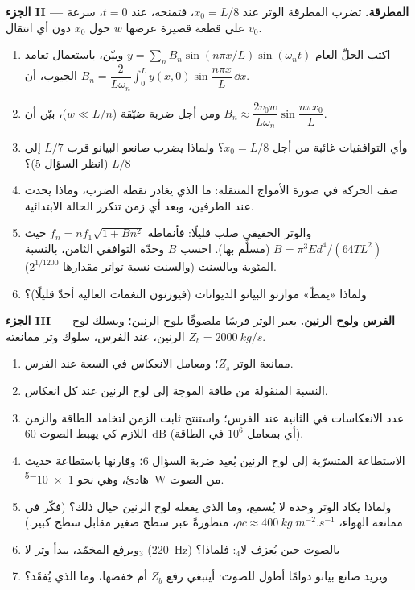 \begin{problem}
\medskip
\noindent\textbf{الجزء II --- المطرقة.}
تضرب المطرقة الوتر عند $x_0 = L/8$، فتمنحه، عند $t = 0$،
سرعة $v_0$ على قطعة قصيرة عرضها $w$ حول $x_0$ دون أي
انتقال.
\begin{enumerate}[resume]
  \item اكتب الحلّ العام $y = \sum_nB_n\sin(n\pi x/L)\sin(\omega_nt)$
        وبيّن، باستعمال تعامد الجيوب، أن $B_n =
        \dfrac{2}{L\omega_n}\int_0^L\dot y(x, 0)\sin\dfrac{n\pi x}L\,\dd x$.
  \item ومن أجل ضربة ضيّقة ($w \ll L/n$)، بيّن أن $B_n \approx \dfrac{2v_0w}
        {L\omega_n}\sin\dfrac{n\pi x_0}{L}$.
  \item وأي التوافقيات غائبة من أجل $x_0 = L/8$؟ ولماذا يضرب
        صانعو البيانو قرب $L/7$ إلى $L/8$ (انظر السؤال 5)؟
  \item صف الحركة في صورة الأمواج المنتقلة: ما الذي يغادر
        نقطة الضرب، وماذا يحدث عند الطرفين، وبعد أي زمن
        تتكرر الحالة الابتدائية.
  \item والوتر الحقيقي صلب قليلًا: فأنماطه $f_n = nf_1
        \sqrt{1 + Bn^2}$ حيث $B = \pi^3Ed^4/(64TL^2)$ (مسلَّم بها). احسب
        $B$ وحدّة التوافقي الثامن، بالنسبة المئوية
        وبالسنت (والسنت نسبة تواتر مقدارها $2^{1/1200}$).
  \item ولماذا «يمطّ» موازنو البيانو الديوانات (فيوزنون النغمات
        العالية أحدّ قليلًا)؟
\end{enumerate}

\medskip
\noindent\textbf{الجزء III --- الفرس ولوح الرنين.}
يعبر الوتر فرسًا ملصوقًا بلوح الرنين؛ ويسلك لوح الرنين،
عند الفرس، سلوك وتر ممانعته $Z_b = \qty{2000}{kg/s}$.
\begin{enumerate}[resume]
  \item ممانعة الوتر $Z_s$؛ ومعامل الانعكاس في السعة
        عند الفرس.
  \item النسبة المنقولة من طاقة الموجة إلى لوح الرنين عند
        كل انعكاس.
  \item عدد الانعكاسات في الثانية عند الفرس؛ واستنتج ثابت
        الزمن لتخامد الطاقة والزمن اللازم كي يهبط الصوت
        \qty{60}{dB} (أي بمعامل $10^6$ في الطاقة).
  \item الاستطاعة المتسرّبة إلى لوح الرنين بُعيد ضربة
        السؤال 6؛ وقارنها باستطاعة حديث هادئ، وهي
        نحو \qty{1e-5}{W} من الصوت.
  \item ولماذا يكاد الوتر وحده لا يُسمع، وما الذي يفعله لوح
        الرنين حيال ذلك؟ (فكّر في ممانعة الهواء،
        $\rho c \approx \qty{400}{kg.m^{-2}.s^{-1}}$، منظورةً عبر سطح
        صغير مقابل سطح كبير.)
  \item وبرفع المخمّد، يبدأ وتر لا$_3$ (\qty{220}{Hz}) بالصوت
        حين يُعزف لا$_4$: فلماذا؟
  \item ويريد صانع بيانو دوامًا أطول للصوت: أينبغي رفع $Z_b$ أم
        خفضها، وما الذي يُفقَد؟
\end{enumerate}


\end{problem}
